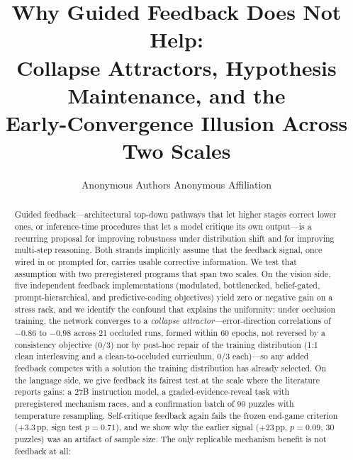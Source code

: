 \documentclass[10pt]{article}
\title{Why Guided Feedback Does Not Help:\\
Collapse Attractors, Hypothesis Maintenance, and the\\
Early-Convergence Illusion Across Two Scales}
\author{\name Anonymous Authors \AND \addr Anonymous Affiliation}
\begin{document}
\maketitle

\let\thefootnote\relax{}\let\thefootnote\arabic

\begin{abstract}
Guided feedback---architectural top-down pathways that let higher stages
correct lower ones, or inference-time procedures that let a model critique
its own output---is a recurring proposal for improving robustness under
distribution shift and for improving multi-step reasoning. Both strands
implicitly assume that the feedback signal, once wired in or prompted for,
carries usable corrective information. We test that assumption with two
preregistered programs that span two scales. On the vision side, five
independent feedback implementations (modulated, bottlenecked,
belief-gated, prompt-hierarchical, and predictive-coding objectives) yield
zero or negative gain on a stress rack, and we identify the confound that
explains the uniformity: under occlusion training, the network converges to
a \emph{collapse attractor}---error-direction correlations of $-0.86$ to
$-0.98$ across 21 occluded runs, formed within 60 epochs, not reversed by a
consistency objective (0/3) nor by post-hoc repair of the training
distribution (1:1 clean interleaving and a clean-to-occluded curriculum,
0/3 each)---so any added feedback competes with a
solution the training distribution has already selected. On the language
side, we give feedback its fairest test at the scale where the literature
reports gains: a 27B instruction model, a graded-evidence-reveal task with
preregistered mechanism races, and a confirmation batch of 90 puzzles with
temperature resampling. Self-critique feedback again fails the frozen
end-game criterion ($+3.3$\,pp, sign test $p = 0.71$), and we show why the
earlier signal ($+23$\,pp, $p = 0.09$, 30 puzzles) was an artifact of
sample size. The only replicable mechanism benefit is not feedback at all:

\end{abstract}
\end{document}
